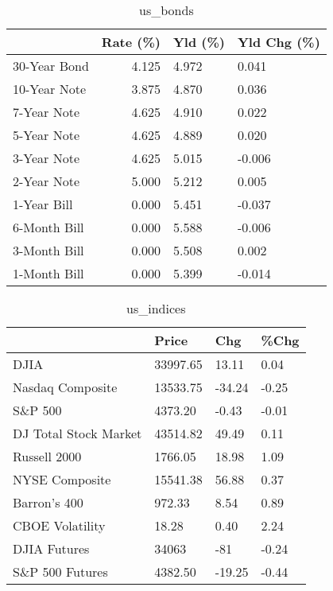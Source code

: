 \documentclass{article}%
\begin{document}
%


\begin{table}[htbp]%
\caption{us\_bonds}%
\centering%
\begin{adjustbox}{width=1\textwidth}%
\begin{tabular}{lrll}
\toprule
             &  Rate (\%) & Yld (\%) & Yld Chg (\%) \\
\midrule
30-Year Bond &     4.125 &   4.972 &       0.041 \\
10-Year Note &     3.875 &   4.870 &       0.036 \\
 7-Year Note &     4.625 &   4.910 &       0.022 \\
 5-Year Note &     4.625 &   4.889 &       0.020 \\
 3-Year Note &     4.625 &   5.015 &      -0.006 \\
 2-Year Note &     5.000 &   5.212 &       0.005 \\
 1-Year Bill &     0.000 &   5.451 &      -0.037 \\
6-Month Bill &     0.000 &   5.588 &      -0.006 \\
3-Month Bill &     0.000 &   5.508 &       0.002 \\
1-Month Bill &     0.000 &   5.399 &      -0.014 \\
\bottomrule
\end{tabular}
%
\end{adjustbox}%
\end{table}

%


\begin{table}[htbp]%
\caption{us\_indices}%
\centering%
\begin{adjustbox}{width=1\textwidth}%
\begin{tabular}{llll}
\toprule
                      &    Price &    Chg &  \%Chg \\
\midrule
                 DJIA & 33997.65 &  13.11 &  0.04 \\
     Nasdaq Composite & 13533.75 & -34.24 & -0.25 \\
              S\&P 500 &  4373.20 &  -0.43 & -0.01 \\
DJ Total Stock Market & 43514.82 &  49.49 &  0.11 \\
         Russell 2000 &  1766.05 &  18.98 &  1.09 \\
       NYSE Composite & 15541.38 &  56.88 &  0.37 \\
         Barron's 400 &   972.33 &   8.54 &  0.89 \\
      CBOE Volatility &    18.28 &   0.40 &  2.24 \\
         DJIA Futures &    34063 &    -81 & -0.24 \\
      S\&P 500 Futures &  4382.50 & -19.25 & -0.44 \\
\bottomrule
\end{tabular}
%
\end{adjustbox}%
\end{table}
\end{document}

